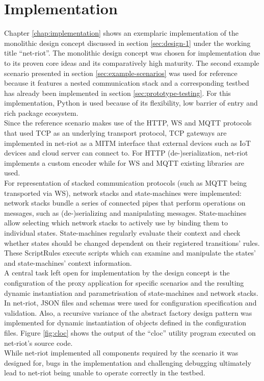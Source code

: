 \section{Implementation}
\label{sec:summary-implementation}
Chapter \ref{chap:implementation} shows an exemplaric implementation of the monolithic design concept discussed in section \ref{sec:design-1} under the working title \enquote{net-riot}. The monolithic design concept was chosen for implementation due to its proven core ideas and its comparatively high maturity. The second example scenario presented in section \ref{sec:example-scenarios} was used for reference because it features a nested communication stack and a corresponding testbed has already been implemented in section \ref{sec:prototype-testing}. For this implementation, Python is used because of its flexibility, low barrier of entry and rich package ecosystem.\\
Since the reference scenario makes use of the \ac{HTTP}, \ac{WS} and \ac{MQTT} protocols that used \ac{TCP} as an underlying transport protocol, \ac{TCP} gateways are implemented in net-riot as a \ac{MITM} interface that external devices such as \ac{IoT} devices and cloud server can connect to. For \ac{HTTP} (de-)serialization, net-riot implements a custom encoder while for \ac{WS} and \ac{MQTT} existing libraries are used.\\
For representation of stacked communication protocols (such as \ac{MQTT} being transported via \ac{WS}), network stacks and state-machines were implemented: network stacks bundle a series of connected pipes that perform operations on messages, such as (de-)serializing and manipulating messages. State-machines allow selecting which network stacks to actively use by binding them to individual states. State-machines regularly evaluate their context and check whether states should be changed dependent on their registered transitions' rules. These ScriptRules execute scripts which can examine and manipulate the states' and state-machines' context information.\\
A central task left open for implementation by the design concept is the configuration of the proxy application for specific scenarios and the resulting dynamic instantiation and parametrisation of state-machines and network stacks. In net-riot, \ac{JSON} files and schemas were used for configuration specification and validation. Also, a recursive variance of the abstract factory design pattern was implemented for dynamic instantiation of objects defined in the configuration files. Figure \ref{fig:cloc} shows the output of the \enquote{cloc} utility program executed on net-riot's source code.\\
While net-riot implemented all components required by the scenario it was designed for, bugs in the implementation and challenging debugging ultimately lead to net-riot being unable to operate correctly in the testbed.

